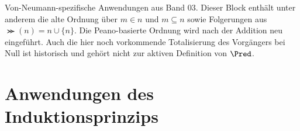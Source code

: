 \documentclass[main.tex]{subfiles}
\begin{document}
\begin{tabproof}
\end{tabproof}

\iffalse
Von-Neumann-spezifische Anwendungen aus Band 03. Dieser Block enthält unter
anderem die alte Ordnung über \(m\in n\) und \(m\subseteq n\) sowie Folgerungen
aus \(\Succ(n)=n\cup\{n\}\). Die Peano-basierte Ordnung wird nach der Addition
neu eingeführt. Auch die hier noch vorkommende Totalisierung des Vorgängers bei
Null ist historisch und gehört nicht zur aktiven Definition von \(\Pred\).
\section{Anwendungen des Induktionsprinzips}
\end{document}
